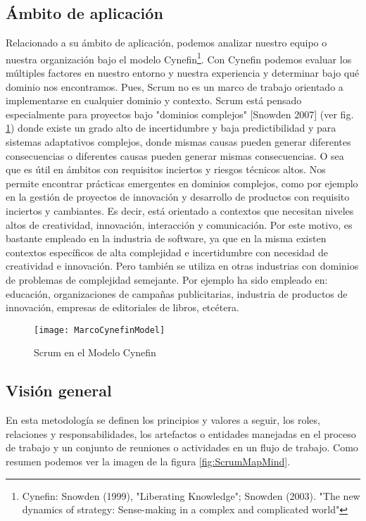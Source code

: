 \subsection{Ámbito de aplicación}

Relacionado a su ámbito de aplicación, podemos analizar nuestro equipo o nuestra organización bajo el modelo Cynefin\footnote{Cynefin: Snowden (1999), "Liberating Knowledge"; Snowden (2003). "The new dynamics of strategy: Sense-making in a complex and complicated world"}. Con Cynefin podemos evaluar los múltiples factores en nuestro entorno y nuestra experiencia y determinar bajo qué dominio nos encontramos. Pues, Scrum no es un marco de trabajo orientado a implementarse en cualquier dominio y contexto. Scrum está pensado especialmente para proyectos bajo "dominios complejos" [Snowden 2007] (ver fig. \ref{fig:MarcoCynefinModel}) donde existe un grado alto de incertidumbre y baja predictibilidad y para sistemas adaptativos complejos, donde mismas causas pueden generar diferentes consecuencias o diferentes causas pueden generar mismas consecuencias. O sea que es útil en ámbitos con requisitos inciertos y riesgos técnicos altos. Nos permite encontrar prácticas emergentes en dominios complejos, como por ejemplo en la gestión de proyectos de innovación \cite{Martin-Alaimo-2014} y desarrollo de productos con requisito inciertos y cambiantes. Es decir, está orientado a contextos que necesitan niveles altos de creatividad, innovación, interacción y comunicación. Por este motivo, es bastante empleado en la industria de software, ya que en la misma existen contextos específicos de alta complejidad e incertidumbre con necesidad de creatividad e innovación. Pero también se utiliza en otras industrias con dominios de problemas de complejidad semejante. Por ejemplo ha sido empleado en: educación, organizaciones de campañas publicitarias, industria de productos de innovación, empresas de editoriales de libros, etcétera.

\begin{figure}[h]
  \centering
  \texttt{[image: MarcoCynefinModel]}
  \caption{Scrum en el Modelo Cynefin}
  \centering
  \label{fig:MarcoCynefinModel} %
\end{figure}

\subsection{Visión general}

En esta metodología se definen los principios y valores a seguir, los roles, relaciones y responsabilidades, los artefactos o entidades manejadas en el proceso de trabajo y un conjunto de reuniones o actividades en un flujo de trabajo. Como resumen podemos ver la imagen de la figura \ref{fig:ScrumMapMind}.

